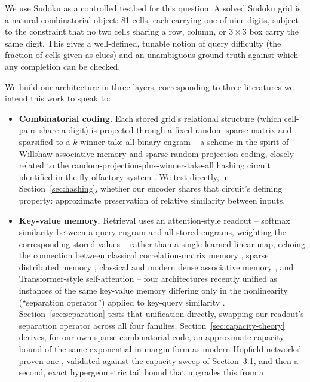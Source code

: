 \documentclass[11pt]{article}
\begin{document}
We use Sudoku as a controlled testbed for this question. A solved Sudoku grid is a natural
combinatorial object: 81 cells, each carrying one of nine digits, subject to the constraint
that no two cells sharing a row, column, or $3\times3$ box carry the same digit. This gives a
well-defined, tunable notion of query difficulty (the fraction of cells given as clues) and an
unambiguous ground truth against which any completion can be checked.

We build our architecture in three layers, corresponding to three literatures we intend this
work to speak to:

\begin{itemize}
  \item \textbf{Combinatorial coding.} Each stored grid's relational structure (which
  cell-pairs share a digit) is projected through a fixed random sparse matrix and sparsified
  to a $k$-winner-take-all binary engram -- a scheme in the spirit of Willshaw associative
  memory \cite{willshaw1969} and sparse random-projection coding, closely related to the
  random-projection-plus-winner-take-all hashing circuit identified in the fly olfactory
  system \cite{dasgupta2017}. We test directly, in Section~\ref{sec:hashing}, whether our
  encoder shares that circuit's defining property: approximate preservation of relative
  similarity between inputs.
  \item \textbf{Key-value memory.} Retrieval uses an attention-style readout -- softmax
  similarity between a query engram and all stored engrams, weighting the corresponding
  stored values -- rather than a single learned linear map, echoing the connection between
  classical correlation-matrix memory \cite{kohonen1972}, sparse distributed memory
  \cite{kanerva1988}, classical and modern dense associative memory
  \cite{krotov2016,ramsauer2020}, and Transformer-style self-attention
  \cite{vaswani2017,schlag2021} -- four architectures recently unified as instances of the
  same key-value memory differing only in the nonlinearity (``separation operator'') applied
  to key-query similarity \cite{gershman2025}. Section~\ref{sec:separation} tests that
  unification directly, swapping our readout's separation operator across all four families.
  Section~\ref{sec:capacity-theory} derives, for our own sparse combinatorial code, an
  approximate capacity bound of the same exponential-in-margin form as modern Hopfield
  networks' proven one \cite{ramsauer2020}, validated against the capacity sweep of
  Section~3.1, and then a second, exact hypergeometric tail bound that upgrades this from a

\end{itemize}
\end{document}
